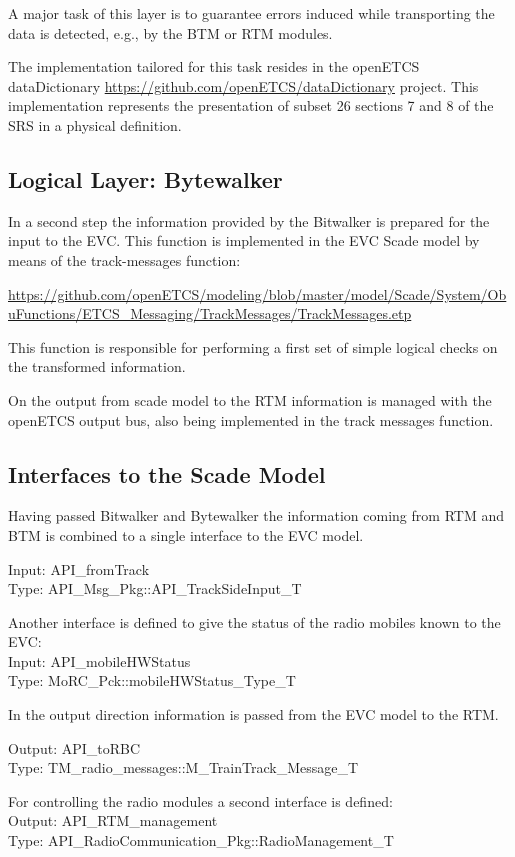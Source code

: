 \documentclass{template/openetcs_report}
\begin{document}
A major task of this layer is to guarantee errors induced while transporting the data is detected, e.g., by the BTM or RTM modules.

The implementation tailored for this task resides in the openETCS dataDictionary \url{https://github.com/openETCS/dataDictionary} project. This implementation represents the presentation of subset 26 sections 7 and 8 of the SRS in a physical definition.

\subsection{Logical Layer: Bytewalker}

In a second step the information provided by the Bitwalker is prepared for the input to the EVC. This function is implemented in the EVC Scade model by means of the track-messages function:

\url{https://github.com/openETCS/modeling/blob/master/model/Scade/System/ObuFunctions/ETCS_Messaging/TrackMessages/TrackMessages.etp}

This function is responsible for performing a first set of simple logical checks on the transformed information.

On the output from scade model to the RTM information is managed with the openETCS output bus, also being implemented in the track messages function.

\subsection{Interfaces to the Scade Model}

Having passed Bitwalker and Bytewalker the information coming from RTM and BTM is combined to a single interface to the EVC model.

Input: API\_fromTrack\\
Type: API\_Msg\_Pkg::API\_TrackSideInput\_T

Another interface is defined to give the status of the radio mobiles known to the EVC:\\
Input: API\_mobileHWStatus\\
Type: MoRC\_Pck::mobileHWStatus\_Type\_T

In the output direction information is passed from the EVC model to the RTM.

Output: API\_toRBC\\
Type: TM\_radio\_messages::M\_TrainTrack\_Message\_T

For controlling the radio modules a second interface is defined:\\
Output: API\_RTM\_management\\
Type: API\_RadioCommunication\_Pkg::RadioManagement\_T
\end{document}
